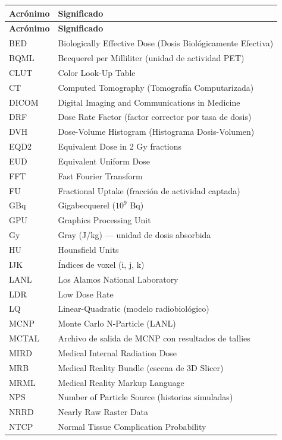 \documentclass[12pt,a4paper]{article}
\begin{document}
\begin{longtable}{p{3.5cm} p{11cm}}
\toprule
\textbf{Acrónimo} & \textbf{Significado} \\
\midrule
\endfirsthead
\toprule
\textbf{Acrónimo} & \textbf{Significado} \\
\midrule
\endhead
\bottomrule
\endfoot
BED & Biologically Effective Dose (Dosis Biológicamente Efectiva) \\
BQML & Becquerel per Milliliter (unidad de actividad PET) \\
CLUT & Color Look-Up Table \\
CT & Computed Tomography (Tomografía Computarizada) \\
DICOM & Digital Imaging and Communications in Medicine \\
DRF & Dose Rate Factor (factor corrector por tasa de dosis) \\
DVH & Dose-Volume Histogram (Histograma Dosis-Volumen) \\
EQD2 & Equivalent Dose in 2 Gy fractions \\
EUD & Equivalent Uniform Dose \\
FFT & Fast Fourier Transform \\
FU & Fractional Uptake (fracción de actividad captada) \\
GBq & Gigabecquerel ($10^9$ Bq) \\
GPU & Graphics Processing Unit \\
Gy & Gray (J/kg) --- unidad de dosis absorbida \\
HU & Hounsfield Units \\
IJK & Índices de voxel (i, j, k) \\
LANL & Los Alamos National Laboratory \\
LDR & Low Dose Rate \\
LQ & Linear-Quadratic (modelo radiobiológico) \\
MCNP & Monte Carlo N-Particle (LANL) \\
MCTAL & Archivo de salida de MCNP con resultados de tallies \\
MIRD & Medical Internal Radiation Dose \\
MRB & Medical Reality Bundle (escena de 3D Slicer) \\
MRML & Medical Reality Markup Language \\
NPS & Number of Particle Source (historias simuladas) \\
NRRD & Nearly Raw Raster Data \\
NTCP & Normal Tissue Complication Probability \\

\end{longtable}
\end{document}
